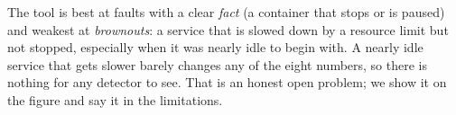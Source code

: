\begin{simplebox}
The tool is best at faults with a clear \emph{fact} (a container that stops or is paused) and weakest at \emph{brownouts}: a service that is slowed down by a resource limit but not stopped, especially when it was nearly idle to begin with. A nearly idle service that gets slower barely changes any of the eight numbers, so there is nothing for any detector to see. That is an honest open problem; we show it on the figure and say it in the limitations.
\end{simplebox}

